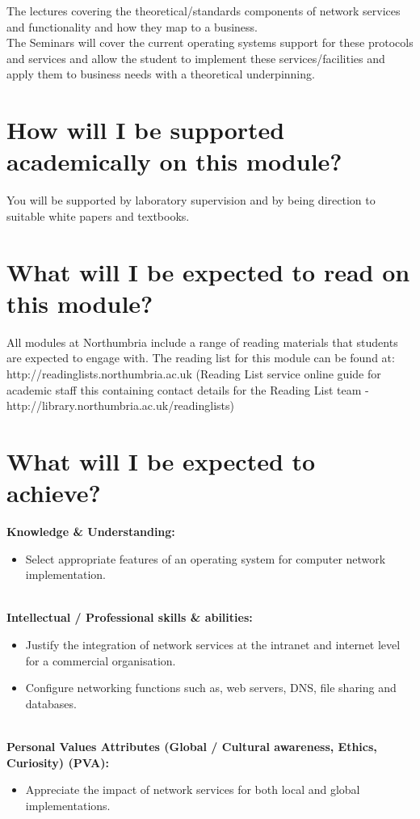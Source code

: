 \documentclass[11pt]{article}
\begin{document}
\noindent The lectures covering the theoretical/standards components of network services and functionality and how they map to a business.\\

\noindent The Seminars will cover the current operating systems support for these protocols and services and allow the student to implement these services/facilities and apply them to business needs with a theoretical underpinning.\\



\section{How will I be supported academically on this module?}

\noindent You will be supported by laboratory supervision and by being direction to suitable white papers and textbooks.\\

\section{What will I be expected to read on this module?}

\noindent All modules at Northumbria include a range of reading materials that students are expected to engage with. The reading list for this module can be found at: http://readinglists.northumbria.ac.uk
(Reading List service online guide for academic staff this containing contact details for the Reading List team - http://library.northumbria.ac.uk/readinglists)\\

\section{What will I be expected to achieve?}

\noindent \textbf{Knowledge \& Understanding:}
\begin{itemize}
  \item Select appropriate features of an operating system for computer network implementation.
\end{itemize}
~\\
\noindent \textbf{Intellectual / Professional skills \& abilities:}
\begin{itemize}
  \item Justify the integration of network services at the intranet and internet level for a commercial organisation.
  \item Configure networking functions such as, web servers, DNS, file sharing and databases.  
\end{itemize}
~
\\\noindent \textbf{Personal Values Attributes (Global / Cultural awareness, Ethics, Curiosity) (PVA):}
\begin{itemize}
  \item Appreciate the impact of network services for both local and global implementations.
\end{itemize}
\end{document}
